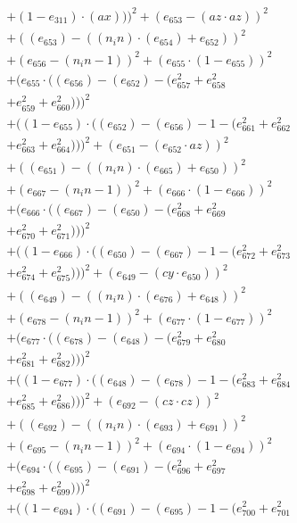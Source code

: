 \documentclass[10pt, a4paper]{article}
\begin{document}
\begin{small}
\begin{align*}
& + (1 - e_{311})  \cdot  (ax)))^{2} + (e_{653} - (az  \cdot  az))^{2} \\
& + ((e_{653}) - ((n_in)  \cdot  (e_{654}) + e_{652}))^{2} \\
& + (e_{656} - (n_in - 1))^{2} + (e_{655}  \cdot  (1 - e_{655}))^{2} \\
& + (e_{655}  \cdot  ((e_{656}) - (e_{652}) - (e_{657}^{2} + e_{658}^{2} \\
& + e_{659}^{2} + e_{660}^{2})))^{2} \\
& + ((1 - e_{655})  \cdot  ((e_{652}) - (e_{656}) - 1 - (e_{661}^{2} + e_{662}^{2} \\
& + e_{663}^{2} + e_{664}^{2})))^{2} + (e_{651} - (e_{652}  \cdot  az))^{2} \\
& + ((e_{651}) - ((n_in)  \cdot  (e_{665}) + e_{650}))^{2} \\
& + (e_{667} - (n_in - 1))^{2} + (e_{666}  \cdot  (1 - e_{666}))^{2} \\
& + (e_{666}  \cdot  ((e_{667}) - (e_{650}) - (e_{668}^{2} + e_{669}^{2} \\
& + e_{670}^{2} + e_{671}^{2})))^{2} \\
& + ((1 - e_{666})  \cdot  ((e_{650}) - (e_{667}) - 1 - (e_{672}^{2} + e_{673}^{2} \\
& + e_{674}^{2} + e_{675}^{2})))^{2} + (e_{649} - (cy  \cdot  e_{650}))^{2} \\
& + ((e_{649}) - ((n_in)  \cdot  (e_{676}) + e_{648}))^{2} \\
& + (e_{678} - (n_in - 1))^{2} + (e_{677}  \cdot  (1 - e_{677}))^{2} \\
& + (e_{677}  \cdot  ((e_{678}) - (e_{648}) - (e_{679}^{2} + e_{680}^{2} \\
& + e_{681}^{2} + e_{682}^{2})))^{2} \\
& + ((1 - e_{677})  \cdot  ((e_{648}) - (e_{678}) - 1 - (e_{683}^{2} + e_{684}^{2} \\
& + e_{685}^{2} + e_{686}^{2})))^{2} + (e_{692} - (cz  \cdot  cz))^{2} \\
& + ((e_{692}) - ((n_in)  \cdot  (e_{693}) + e_{691}))^{2} \\
& + (e_{695} - (n_in - 1))^{2} + (e_{694}  \cdot  (1 - e_{694}))^{2} \\
& + (e_{694}  \cdot  ((e_{695}) - (e_{691}) - (e_{696}^{2} + e_{697}^{2} \\
& + e_{698}^{2} + e_{699}^{2})))^{2} \\
& + ((1 - e_{694})  \cdot  ((e_{691}) - (e_{695}) - 1 - (e_{700}^{2} + e_{701}^{2} \\

\end{align*}
\end{small}
\end{document}
